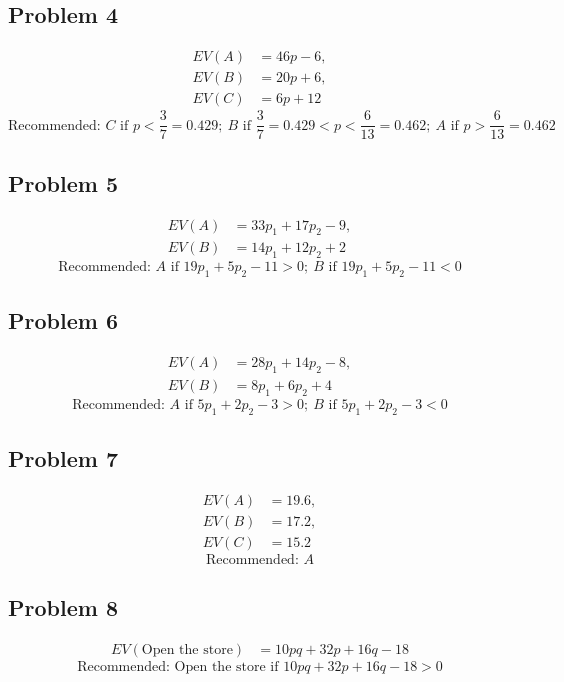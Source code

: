 \subsection*{Problem 4}
\[
\begin{aligned}
	EV(A) &= 46p-6,\\
	EV(B) &= 20p+6,\\
	EV(C) &= 6p+12
\end{aligned}
\]
\[
\text{Recommended: } C \text{ if } p<\frac{3}{7}=0.429;\ B \text{ if } \frac{3}{7}=0.429<p<\frac{6}{13}=0.462;\ A \text{ if } p>\frac{6}{13}=0.462
\]

\subsection*{Problem 5}
\[
\begin{aligned}
	EV(A) &= 33p_1+17p_2-9,\\
	EV(B) &= 14p_1+12p_2+2
\end{aligned}
\]
\[
\text{Recommended: } A \text{ if } 19p_1+5p_2-11>0;\ B \text{ if } 19p_1+5p_2-11<0
\]

\subsection*{Problem 6}
\[
\begin{aligned}
	EV(A) &= 28p_1+14p_2-8,\\
	EV(B) &= 8p_1+6p_2+4
\end{aligned}
\]
\[
\text{Recommended: } A \text{ if } 5p_1+2p_2-3>0;\ B \text{ if } 5p_1+2p_2-3<0
\]

\subsection*{Problem 7}
\[
\begin{aligned}
	EV(A) &= 19.6,\\
	EV(B) &= 17.2,\\
	EV(C) &= 15.2
\end{aligned}
\]
\[
\text{Recommended: } A
\]

\subsection*{Problem 8}
\[
\begin{aligned}
	EV(\text{Open the store}) &= 10pq+32p+16q-18
\end{aligned}
\]
\[
\text{Recommended: } \text{Open the store if } 10pq+32p+16q-18>0
\]

